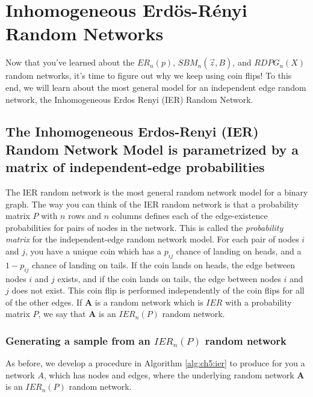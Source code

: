 \section{Inhomogeneous Erd\"os-R\'enyi Random Networks}
\label{sec:ch5:ier}


Now that you've learned about the $ER_n(p)$, $SBM_n(\vec z, B)$, and $RDPG_n(X)$ random networks, it's time to figure out why we keep using coin flips! To this end, we will learn about the most general model for an independent edge random network, the Inhomogeneous Erdos Renyi (IER) Random Network.

\subsection{The Inhomogeneous Erdos-Renyi (IER) Random Network Model is parametrized by a matrix of independent-edge probabilities}

The IER random network is the most general random network model for a binary graph. The way you can think of the IER random network is that a probability matrix $P$ with $n$ rows and $n$ columns defines each of the edge-existence probabilities for pairs of nodes in the network. This is called the \textit{probability matrix} for the independent-edge random network model. For each pair of nodes $i$ and $j$, you have a unique coin which has a $p_{ij}$ chance of landing on heads, and a $1 - p_{ij}$ chance of landing on tails. If the coin lands on heads, the edge between nodes $i$ and $j$ exists, and if the coin lands on tails, the edge between nodes $i$ and $j$ does not exist. This coin flip is performed independently of the coin flips for all of the other edges. If $\mathbf A$ is a random network which is $IER$ with a probability matrix $P$, we say that $\mathbf A$ is an $IER_n(P)$ random network.

\subsubsection{Generating a sample from an $IER_n(P)$ random network}

As before, we develop a procedure in Algorithm \ref{alg:ch5:ier} to produce for you a network $A$, which has nodes and edges, where the underlying random network $\mathbf A$ is an $IER_n(P)$ random network.

